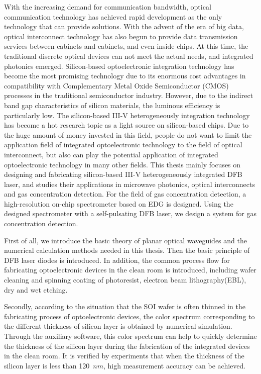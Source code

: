 \begin{englishabstract}
With the increasing demand for communication bandwidth, optical communication technology has achieved rapid development as the only technology that can provide solutions. With the advent of the era of big data, optical interconnect technology has also begun to provide data transmission services between cabinets and cabinets, and even inside chips. At this time, the traditional discrete optical devices can not meet the actual needs, and integrated photonics emerged. Silicon-based optoelectronic integration technology has become the most promising technology due to its enormous cost advantages in compatibility with Complementary Metal Oxide Semiconductor (CMOS) processes in the traditional semiconductor industry. However, due to the indirect band gap characteristics of silicon materials, the luminous efficiency is particularly low. The silicon-based III-V heterogeneously integration technology has become a hot research topic as a light source on silicon-based chips. Due to the huge amount of money invested in this field, people do not want to limit the application field of integrated optoelectronic technology to the field of optical interconnect, but also can play the potential application of integrated optoelectronic technology in many other fields. This thesis mainly focuses on designing and fabricating silicon-based III-V heterogeneously integrated DFB laser, and studies their applications in microwave photonics, optical interconnects and gas concentration detection. For the field of gas concentration detection, a high-resolution on-chip spectrometer based on EDG is designed. Using the designed spectrometer with a self-pulsating DFB laser, we design a system for gas concentration detection.

First of all, we introduce the basic theory of planar optical waveguides and the numerical calculation methods needed in this thesis. Then the basic principle of DFB laser diodes is introduced. In addition, the common process flow for fabricating optoelectronic devices in the clean room is introduced, including wafer cleaning and spinning coating of photoresist, electron beam lithography(EBL), dry and wet etching.

Secondly, according to the situation that the SOI wafer is often thinned in the fabricating process of optoelectronic devices, the color spectrum corresponding to the different thickness of silicon layer is obtained by numerical simulation. Through the auxiliary software, this color spectrum can help to quickly determine the thickness of the silicon layer during the fabrication of the integrated devices in the clean room. It is verified by experiments that when the thickness of the silicon layer is less than 120~$nm$, high measurement accuracy can be achieved.


\end{englishabstract}
